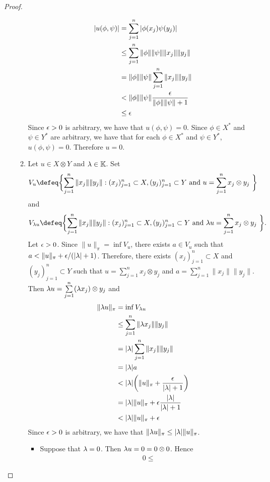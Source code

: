 \documentclass{book}
\begin{document}
\begin{proof}
\begin{enumerate}
\begin{enumerate}
			\begin{align*}
				|u(\phi, \psi)|
				& = \sum\limits_{j=1}^n |\phi(x_j) \psi(y_j)| \\
				& \leq \sum\limits_{j=1}^n \|\phi\| \|\psi\| \|x_j\| \|y_j\| \\
				& = \|\phi\| \|\psi\| \sum\limits_{j=1}^n  \|x_j\| \|y_j\| \\
				& < \|\phi\| \|\psi\|  \frac{\epsilon}{\|\phi\|\|\psi\| + 1} \\
				& \leq   \epsilon 
			\end{align*}
			Since $\epsilon > 0$ is arbitrary, we have that $u(\phi, \psi) = 0$. Since $\phi \in X^*$ and $\psi \in Y^*$ are arbitrary, we have that for each $\phi \in X^*$ and $\psi \in Y^*$, $u(\phi, \psi) = 0$. Therefore $u = 0$. 
			\item Let $u \in X \otimes Y $ and $\lambda \in \mathbb{K}$. Set 
			$$V_u \defeq \bigg\{ \text{$\sum_{j=1}^n \|x_j\| \|y_j\| : (x_j)_{j=1}^n \subset X, (y_j)_{j=1}^n \subset Y $ and $u = \sum_{j=1}^n x_j \otimes y_j$ }\bigg\}$$ 
			and 
			$$V_{\lam u} \defeq \bigg\{ \text{$\sum_{j=1}^n \|x_j\| \|y_j\| : (x_j)_{j=1}^n \subset X, (y_j)_{j=1}^n \subset Y $ and $\lam u = \sum_{j=1}^n x_j \otimes y_j$ }\bigg\}.$$ 
			Let $\epsilon > 0$. Since $\|u\|_{\pi} = \inf V_u$, there exists $a \in V_u$ such that $a < \|u\|_{\pi} + \epsilon/(|\lambda| +1)$. Therefore, there exists $(x_j)_{j=1}^n \subset X$ and $(y_j)_{j=1}^n \subset Y$ such that $u = \sum\limits_{j=1}^n x_j \otimes y_j$ and $a = \sum_{j=1}^n \|x_j\| \|y_j\| $. Then $\lambda u = \sum\limits_{j=1}^n (\lambda x_j) \otimes y_j $ and 
			\begin{align*}
				\|\lambda u\|_{\pi}
				& = \inf V_{\lambda u} \\
				& \leq \sum_{j=1}^n \|\lambda x_j\| \|y_j\| \\
				& = |\lambda| \sum_{j=1}^n \| x_j\| \|y_j\| \\
				& = |\lambda| a \\
				& < |\lambda| \bigg( \|u\|_{\pi} + \frac{\epsilon}{|\lambda| +1} \bigg) \\
				& = |\lambda| \|u\|_{\pi} + \epsilon \frac{|\lambda|}{|\lambda| + 1} \\
				& < |\lambda| \|u\|_{\pi} + \epsilon
			\end{align*}
			Since $\epsilon > 0$ is arbitrary, we have that $\|\lambda u\|_{\pi} \leq |\lambda| \|u\|_{\pi}$.
			\begin{itemize}
				\item Suppose that $\lambda = 0$. Then $\lambda u = 0 = 0 \otimes 0$. Hence
				\begin{align*}
					0 \leq 

\end{align*}
\end{itemize}
\end{enumerate}
\end{enumerate}
\end{proof}
\end{document}
